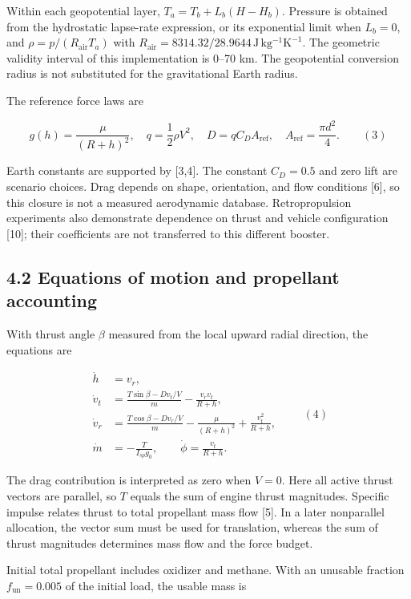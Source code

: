 \documentclass[
  11pt,
  a4paper,
]{article}
\begin{document}
Within each geopotential layer, \(T_a=T_b+L_b(H-H_b)\). Pressure is
obtained from the hydrostatic lapse-rate expression, or its exponential
limit when \(L_b=0\), and \(\rho=p/(R_{\mathrm{air}}T_a)\) with
\(R_{\mathrm{air}}=8314.32/28.9644\,\mathrm{J\,kg^{-1}K^{-1}}\). The
geometric validity interval of this implementation is 0--70 km. The
geopotential conversion radius is not substituted for the gravitational
Earth radius.

The reference force laws are

\[ g(h)=\frac{\mu}{(R+h)^2},\quad q=\frac12\rho V^2,\quad D=qC_DA_{\mathrm{ref}},\quad A_{\mathrm{ref}}=\frac{\pi d^2}{4}. \qquad (3) \]

Earth constants are supported by {[}3,4{]}. The constant \(C_D=0.5\) and
zero lift are scenario choices. Drag depends on shape, orientation, and
flow conditions {[}6{]}, so this closure is not a measured aerodynamic
database. Retropropulsion experiments also demonstrate dependence on
thrust and vehicle configuration {[}10{]}; their coefficients are not
transferred to this different booster.

\subsection{4.2 Equations of motion and propellant
accounting}\label{equations-of-motion-and-propellant-accounting}

With thrust angle \(\beta\) measured from the local upward radial
direction, the equations are

\[
\begin{aligned}
\dot h &= v_r,\\
\dot v_t &= \frac{T\sin\beta-Dv_t/V}{m}-\frac{v_rv_t}{R+h},\\
\dot v_r &= \frac{T\cos\beta-Dv_r/V}{m}-\frac{\mu}{(R+h)^2}+\frac{v_t^2}{R+h},\\
\dot m &= -\frac{T}{I_{sp}g_0},\qquad \dot\phi=\frac{v_t}{R+h}.
\end{aligned}\qquad (4)
\]

The drag contribution is interpreted as zero when \(V=0\). Here all
active thrust vectors are parallel, so \(T\) equals the sum of engine
thrust magnitudes. Specific impulse relates thrust to total propellant
mass flow {[}5{]}. In a later nonparallel allocation, the vector sum
must be used for translation, whereas the sum of thrust magnitudes
determines mass flow and the force budget.

Initial total propellant includes oxidizer and methane. With an unusable
fraction \(f_{\mathrm{un}}=0.005\) of the initial load, the usable mass
is
\end{document}

